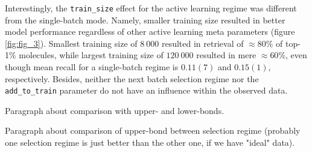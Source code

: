 Interestingly, the \texttt{train\_size} effect for the active learning regime was different from the single-batch mode. Namely, smaller training size resulted in better model performance regardless of other active learning meta parameters (figure \ref{fig:fig_3}). Smallest training size of $8~000$ resulted in retrieval of $\approx80\%$ of top-1\% molecules, while largest training size of $120~000$ resulted in mere $\approx60\%$, even though mean recall for a single-batch regime is $0.11(7)$ and $0.15(1)$, respectively. Besides, neither the next batch selection regime nor the \texttt{add\_to\_train} parameter do not have an influence within the observed data.

Paragraph about comparison with upper- and lower-bonds.

Paragraph about comparison of upper-bond between selection regime (probably one selection  regime is just better than the other one, if we have "ideal" data).
